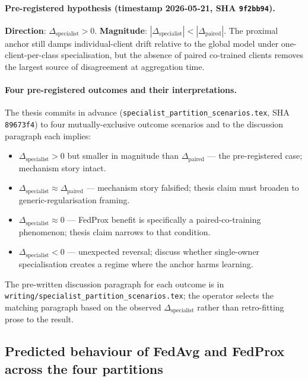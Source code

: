 \paragraph{Pre-registered hypothesis
        (timestamp 2026-05-21, SHA \texttt{9f2bb94}).}
\textbf{Direction}: $\Delta_{\mathrm{specialist}} > 0$.
\textbf{Magnitude}: $|\Delta_{\mathrm{specialist}}| < |\Delta_{\mathrm{paired}}|$.
The proximal anchor still damps individual-client drift relative to
the global model under one-client-per-class specialisation, but the
absence of paired co-trained clients removes the largest source of
disagreement at aggregation time.

\paragraph{Four pre-registered outcomes and their interpretations.}
The thesis commits in advance (\texttt{specialist\_partition\_scenarios.tex}, SHA
\texttt{89673f4}) to four mutually-exclusive outcome scenarios and to
the discussion paragraph each implies:
\begin{itemize}
  \item $\Delta_{\mathrm{specialist}} > 0$ but smaller in magnitude
        than $\Delta_{\mathrm{paired}}$ — the pre-registered case;
        mechanism story intact.
  \item $\Delta_{\mathrm{specialist}} \approx \Delta_{\mathrm{paired}}$ —
        mechanism story falsified; thesis claim must broaden to
        generic-regularisation framing.
  \item $\Delta_{\mathrm{specialist}} \approx 0$ — FedProx benefit
        is specifically a paired-co-training phenomenon; thesis
        claim narrows to that condition.
  \item $\Delta_{\mathrm{specialist}} < 0$ — unexpected reversal;
        discuss whether single-owner specialisation creates a regime
        where the anchor harms learning.
\end{itemize}
The pre-written discussion paragraph for each outcome is in
\texttt{writing/specialist\_partition\_scenarios.tex}; the operator
selects the matching paragraph based on the observed
$\Delta_{\mathrm{specialist}}$ rather than retro-fitting prose to the
result.

\subsection{Predicted behaviour of FedAvg and FedProx across the four
            partitions}
\label{sec:stat-het-behaviour}

